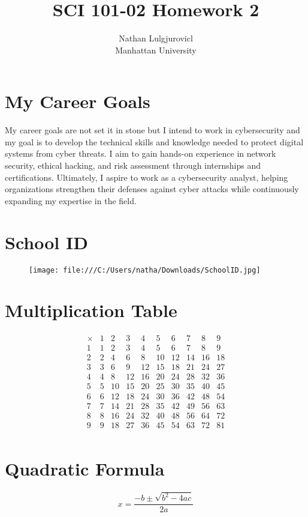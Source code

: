 \documentclass[11pt]{article}
\begin{document}
\title{SCI 101-02 Homework 2}
\author{Nathan Lulgjurovicl\\
Manhattan University}
\maketitle

\section {My Career Goals}

My career goals are not set it in stone but I intend to work in cybersecurity and my goal is to develop the technical skills and knowledge needed to protect digital systems from cyber threats. I aim to gain hands-on experience in network security, ethical hacking, and risk assessment through internships and certifications. Ultimately, I aspire to work as a cybersecurity analyst, helping organizations strengthen their defenses against cyber attacks while continuously expanding my expertise in the field.

\section {School ID}

\begin{figure}[!h]
\centering
\texttt{[image: file:///C:/Users/natha/Downloads/SchoolID.jpg]}
\end{figure}

\section{Multiplication Table}

\[
\begin{array}{c|ccccccccc}
\times & 1 & 2 & 3 & 4 & 5 & 6 & 7 & 8 & 9 \\
\hline
1 & 1 & 2 & 3 & 4 & 5 & 6 & 7 & 8 & 9 \\
2 & 2 & 4 & 6 & 8 & 10 & 12 & 14 & 16 & 18 \\
3 & 3 & 6 & 9 & 12 & 15 & 18 & 21 & 24 & 27 \\
4 & 4 & 8 & 12 & 16 & 20 & 24 & 28 & 32 & 36 \\
5 & 5 & 10 & 15 & 20 & 25 & 30 & 35 & 40 & 45 \\
6 & 6 & 12 & 18 & 24 & 30 & 36 & 42 & 48 & 54 \\
7 & 7 & 14 & 21 & 28 & 35 & 42 & 49 & 56 & 63 \\
8 & 8 & 16 & 24 & 32 & 40 & 48 & 56 & 64 & 72 \\
9 & 9 & 18 & 27 & 36 & 45 & 54 & 63 & 72 & 81 \\
\end{array}
\]

\section{Quadratic Formula}

\[
x = \frac{-b \pm \sqrt{b^2 - 4ac}}{2a}
\]
\end{document}
